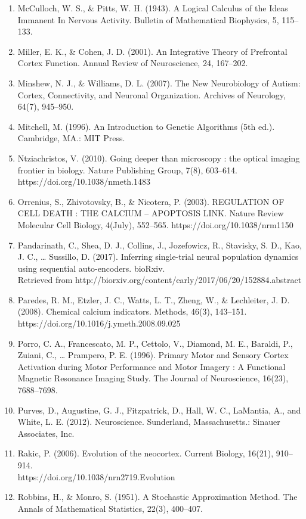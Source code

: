 \documentclass[11pt]{article}
\begin{document}
\begin{enumerate}
\item McCulloch, W. S., \& Pitts, W. H. (1943). A Logical Calculus of the Ideas Immanent In Nervous Activity. Bulletin of Mathematical Biophysics, 5, 115–133.
\item Miller, E. K., \& Cohen, J. D. (2001). An Integrative Theory of Prefrontal Cortex Function. Annual Review of Neuroscience, 24, 167–202.
\item Minshew, N. J., \& Williams, D. L. (2007). The New Neurobiology of Autism: Cortex, Connectivity, and Neuronal Organization. Archives of Neurology, 64(7), 945–950.
\item Mitchell, M. (1996). An Introduction to Genetic Algorithms (5th ed.). Cambridge, MA.: MIT Press.
\item Ntziachristos, V. (2010). Going deeper than microscopy : the optical imaging frontier in biology. Nature Publishing Group, 7(8), 603–614. https://doi.org/10.1038/nmeth.1483
\item Orrenius, S., Zhivotovsky, B., \& Nicotera, P. (2003). REGULATION OF CELL DEATH : THE CALCIUM – APOPTOSIS LINK. Nature Review Molecular Cell Biology, 4(July), 552–565. https://doi.org/10.1038/nrm1150
\item Pandarinath, C., Shea, D. J., Collins, J., Jozefowicz, R., Stavisky, S. D., Kao, J. C., … Sussillo, D. (2017). Inferring single-trial neural population dynamics using sequential auto-encoders. bioRxiv.\\Retrieved from http://biorxiv.org/content/early/2017/06/20/152884.abstract
\item Paredes, R. M., Etzler, J. C., Watts, L. T., Zheng, W., \& Lechleiter, J. D. (2008). Chemical calcium indicators. Methods, 46(3), 143–151. https://doi.org/10.1016/j.ymeth.2008.09.025
\item Porro, C. A., Francescato, M. P., Cettolo, V., Diamond, M. E., Baraldi, P., Zuiani, C., … Prampero, P. E. (1996). Primary Motor and Sensory Cortex Activation during Motor Performance and Motor Imagery : A Functional Magnetic Resonance Imaging Study. The Journal of Neuroscience, 16(23), 7688–7698.
\item Purves, D., Augustine, G. J., Fitzpatrick, D., Hall, W. C., LaMantia, A., and White, L. E. (2012). Neuroscience. Sunderland, Massachusetts.: Sinauer Associates, Inc.
\item Rakic, P. (2006). Evolution of the neocortex. Current Biology, 16(21), 910–914. \\https://doi.org/10.1038/nrn2719.Evolution
\item Robbins, H., \& Monro, S. (1951). A Stochastic Approximation Method. The Annals of Mathematical Statistics, 22(3), 400–407.

\end{enumerate}
\end{document}
